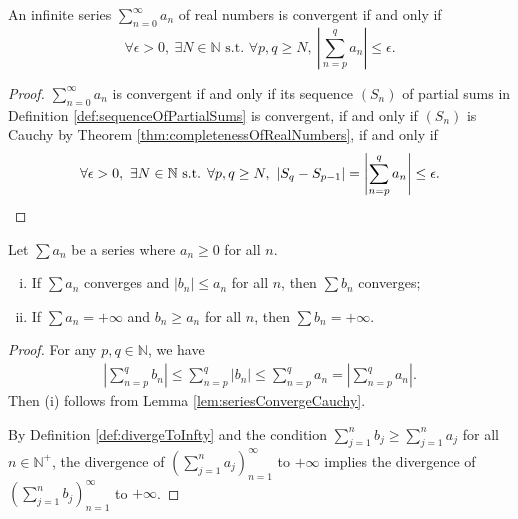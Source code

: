 \begin{lem}
  \label{lem:seriesConvergeCauchy}
  An infinite series $\sum_{n=0}^{\infty} a_n$ of real numbers
  is convergent if and only if
  \begin{equation}
    \label{eq:seriesConvergeCauchy}
    \forall \epsilon>0,\ \exists N\in \mathbb{N} \text{ s.t. }
    \forall p,q\ge N, \ \left|\sum_{n=p}^q a_n\right| \le \epsilon.
  \end{equation}
\end{lem}
\begin{proof}
  $\sum_{n=0}^{\infty}a_{n}$ is convergent if and only if
  its sequence $(S_{n})$ of partial sums
  in Definition \ref{def:sequenceOfPartialSums}
  is convergent, if and only if $(S_{n})$ is Cauchy
  by Theorem \ref{thm:completenessOfRealNumbers}, if and only if
  \begin{displaymath}
    \forall \epsilon>0,\ \exists N\in \mathbb{N} \text{ s.t. }
    \forall p,q\ge N, \ |S_{q}-S_{p-1}|
    =\left|\sum_{n=p}^q a_n\right| \le \epsilon. \qedhere
  \end{displaymath}
\end{proof}

\begin{thm}
  \label{thm:comparisonTest}
  Let $\sum a_n$ be a series where $a_n\ge 0$ for all $n$.
  \begin{enumerate}[(i)]\itemsep0em
  \item If $\sum a_n$ converges and $|b_n|\le a_n$ for all $n$,
    then $\sum b_n$ converges;
  \item If $\sum a_n=+\infty$ and $b_n \ge a_n$ for all $n$,
    then \mbox{$\sum b_n=+\infty$}.
  \end{enumerate}
\end{thm}
\begin{proof}
  For any $p,q\in\mathbb{N}$, we have
  \begin{displaymath}
    \begin{array}{l}
    \left| \sum_{n=p}^{q}b_{n} \right|
    \le  \sum_{n=p}^{q}|b_{n}| \le \sum_{n=p}^{q}a_{n}
    =\left| \sum_{n=p}^{q}a_{n} \right|.
    \end{array}
  \end{displaymath}
  Then (i) follows from Lemma \ref{lem:seriesConvergeCauchy}. 

  By Definition \ref{def:divergeToInfty}
  and the condition
  $\sum_{j=1}^{n}b_{j}\ge \sum_{j=1}^{n}a_{j}$ for all $n\in \mathbb{N}^+$,
  the divergence of $(\sum_{j=1}^{n}a_{j})_{n=1}^{\infty}$ to $+\infty$
  implies the divergence of
  $(\sum_{j=1}^{n}b_{j})_{n=1}^{\infty}$ to $+\infty$.
\end{proof}

